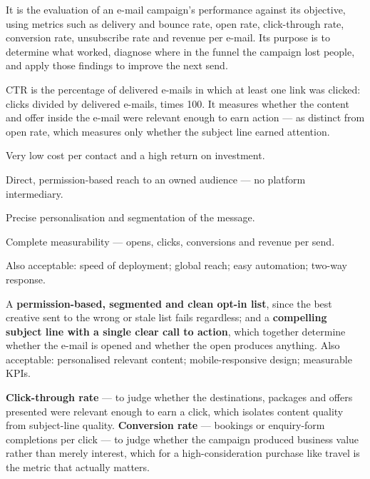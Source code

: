 \begin{qlist}
It is the evaluation of an e-mail campaign's performance against its objective,
using metrics such as delivery and bounce rate, open rate, click-through rate,
conversion rate, unsubscribe rate and revenue per e-mail. Its purpose is to
determine what worked, diagnose where in the funnel the campaign lost people,
and apply those findings to improve the next send.

CTR is the percentage of delivered e-mails in which at least one link was
clicked: clicks divided by delivered e-mails, times 100. It measures whether the
content and offer inside the e-mail were relevant enough to earn action --- as
distinct from open rate, which measures only whether the subject line earned
attention.

\begin{apts}
\item Very low cost per contact and a high return on investment.
\item Direct, permission-based reach to an owned audience --- no platform
      intermediary.
\item Precise personalisation and segmentation of the message.
\item Complete measurability --- opens, clicks, conversions and revenue per send.
\end{apts}
Also acceptable: speed of deployment; global reach; easy automation; two-way
response.

A \textbf{permission-based, segmented and clean opt-in list}, since the best
creative sent to the wrong or stale list fails regardless; and a
\textbf{compelling subject line with a single clear call to action}, which
together determine whether the e-mail is opened and whether the open produces
anything. Also acceptable: personalised relevant content; mobile-responsive
design; measurable KPIs.

\textbf{Click-through rate} --- to judge whether the destinations, packages and
offers presented were relevant enough to earn a click, which isolates content
quality from subject-line quality. \textbf{Conversion rate} --- bookings or
enquiry-form completions per click --- to judge whether the campaign produced
business value rather than merely interest, which for a high-consideration
purchase like travel is the metric that actually matters.


\end{qlist}
